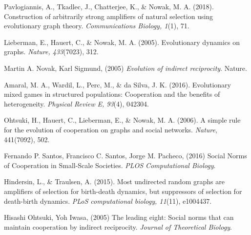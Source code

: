 \documentclass[10pt,a4paper]{article}
\begin{document}
\begin{thebibliography}{9}

Pavlogiannis, A., Tkadlec, J., Chatterjee, K., \& Nowak, M. A. (2018). Construction of arbitrarily strong amplifiers of natural selection using evolutionary graph theory. \textit{Communications Biology, 1}(1), 71.

Lieberman, E., Hauert, C., \& Nowak, M. A. (2005). Evolutionary dynamics on graphs. \textit{Nature, 433}(7023), 312.
	
Martin A. Novak, Karl Sigmund, (2005) 
\textit{Evolution of indirect reciprocity}. 
Nature.

\bibitem{}
Amaral, M. A., Wardil, L., Perc, M., \& da Silva, J. K. (2016). Evolutionary mixed games in structured populations: Cooperation and the benefits of heterogeneity. 
\textit{Physical Review E, 93}(4), 042304.

Ohtsuki, H., Hauert, C., Lieberman, E., \& Nowak, M. A. (2006). A simple rule for the evolution of cooperation on graphs and social networks. \textit{Nature}, 441(7092), 502.

Fernando P. Santos, Francisco C. Santos, Jorge M. Pacheco, (2016) 
Social Norms of Cooperation in Small-Scale Societies.
\textit{PLOS Computational Biology}.

Hindersin, L., \& Traulsen, A. (2015). Most undirected random graphs are amplifiers of selection for birth-death dynamics, but suppressors of selection for death-birth dynamics.
\textit{PLoS computational biology, 11}(11), e1004437.

Hisashi Ohtsuki, Yoh Iwasa, (2005) 
The leading eight: Social norms that can maintain cooperation by indirect reciprocity.
\textit{Journal of Theoretical Biology}.


\end{thebibliography}
\end{document}
